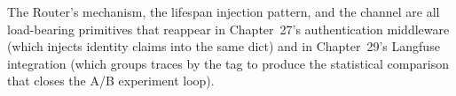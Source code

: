 The Router's  mechanism, the lifespan injection pattern,
and the  channel are all load-bearing primitives that
reappear in Chapter~27's authentication middleware (which injects identity
claims into the same  dict) and in Chapter~29's Langfuse
integration (which groups traces by the  tag to produce
the statistical comparison that closes the A/B experiment loop).
